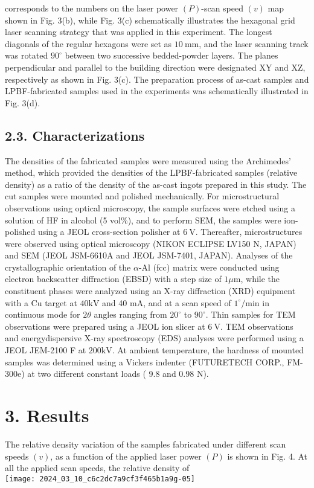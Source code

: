 \documentclass[10pt]{article}
\begin{document}
corresponds to the numbers on the laser power $(P)$-scan speed $(v)$ map shown in Fig. 3(b), while Fig. 3(c) schematically illustrates the hexagonal grid laser scanning strategy that was applied in this experiment. The longest diagonals of the regular hexagons were set as $10 \mathrm{~mm}$, and the laser scanning track was rotated $90^{\circ}$ between two successive bedded-powder layers. The planes perpendicular and parallel to the building direction were designated $\mathrm{XY}$ and $\mathrm{XZ}$, respectively as shown in Fig. 3(c). The preparation process of as-cast samples and LPBF-fabricated samples used in the experiments was schematically illustrated in Fig. 3(d).

\subsection*{2.3. Characterizations}
The densities of the fabricated samples were measured using the Archimedes' method, which provided the densities of the LPBF-fabricated samples (relative density) as a ratio of the density of the as-cast ingots prepared in this study. The cut samples were mounted and polished mechanically. For microstructural observations using optical microscopy, the sample surfaces were etched using a solution of HF in alcohol (5 vol\%), and to perform SEM, the samples were ion-polished using a JEOL cross-section polisher at $6 \mathrm{~V}$. Thereafter, microstructures were observed using optical microscopy (NIKON ECLIPSE LV150 N, JAPAN) and SEM (JEOL JSM-6610A and JEOL JSM-7401, JAPAN). Analyses of the crystallographic orientation of the $\alpha$-Al (fcc) matrix were conducted using electron backscatter diffraction (EBSD) with a step size of $1 \mu \mathrm{m}$, while the constituent phases were analyzed using an $\mathrm{X}$-ray diffraction (XRD) equipment with a $\mathrm{Cu}$ target at $40 \mathrm{kV}$ and 40 $\mathrm{mA}$, and at a scan speed of $1^{\circ} / \mathrm{min}$ in continuous mode for $2 \theta$ angles ranging from $20^{\circ}$ to $90^{\circ}$. Thin samples for TEM observations were prepared using a JEOL ion slicer at $6 \mathrm{~V}$. TEM observations and energydispersive X-ray spectroscopy (EDS) analyses were performed using a JEOL JEM-2100 F at $200 \mathrm{kV}$. At ambient temperature, the hardness of mounted samples was determined using a Vickers indenter (FUTURETECH CORP., FM-300e) at two different constant loads ( 9.8 and 0.98 N).

\section*{3. Results}
The relative density variation of the samples fabricated under different scan speeds $(v)$, as a function of the applied laser power $(P)$ is shown in Fig. 4. At all the applied scan speeds, the relative density of\\
\texttt{[image: 2024\_03\_10\_c6c2dc7a9cf3f465b1a9g-05]}
\end{document}
